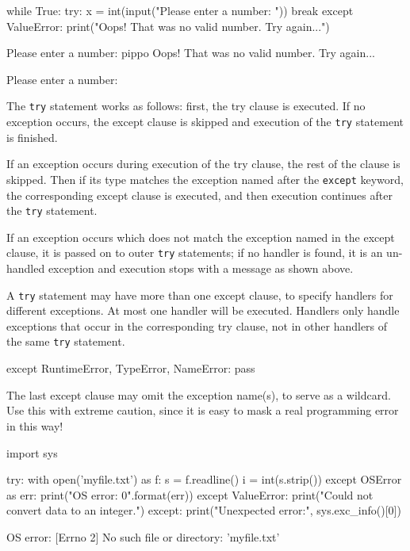 \begin{ipython}
while True: 
    try:
        x = int(input("Please enter a number: ")) 
        break
    except ValueError:
        print("Oops! That was no valid number. Try again...")
\end{ipython}
\begin{ioutput}
Please enter a number: pippo
Oops!  That was no valid number.  Try again...

Please enter a number:
\end{ioutput}

The \texttt{try} statement works as follows: first, the try clause is executed.
If no exception occurs, the except clause is skipped and 
execution of the \texttt{try} statement is finished.

If an exception occurs during execution of the try clause, 
the rest of the clause is skipped. Then if its type matches the 
exception named after the \texttt{except} keyword, the corresponding except clause 
is executed, and then execution continues after the \texttt{try} statement.

If an exception occurs which does not match the exception named in the 
except clause, it is passed on to outer \texttt{try} statements; 
if no handler is found, it is an un-handled exception and execution stops 
with a message as shown above.

A \texttt{try} statement may have more than one except clause, 
to specify handlers for different exceptions. At most one handler will be
executed. Handlers only handle exceptions that occur in the corresponding 
try clause, not in other handlers of the same \texttt{try} statement.

\begin{ipython}
    except RuntimeError, TypeError, NameError:
        pass	
\end{ipython}

The last except clause may omit the exception name(s), to serve as a wildcard.
Use this with extreme caution, since it is easy to mask a real programming 
error in this way! 

\begin{ipython}
import sys 

try:
    with open('myfile.txt') as f: 
        s = f.readline()
        i = int(s.strip()) 
except OSError as err:
    print("OS error: {0}".format(err)) 
except ValueError:
    print("Could not convert data to an integer.") 
except:
    print("Unexpected error:", sys.exc_info()[0])
\end{ipython}
\begin{ioutput}
OS error: [Errno 2] No such file or directory: 'myfile.txt'	
\end{ioutput}

